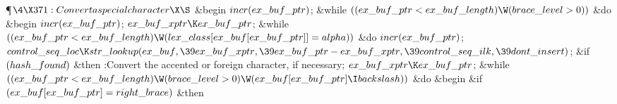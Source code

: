 \Y\P$\4\X371:Convert a special character\X\S$\6
\&{begin} $\\{incr}(\\{ex\_buf\_ptr})$;\6
\&{while} $((\\{ex\_buf\_ptr}<\\{ex\_buf\_length})\W(\\{brace\_level}>0))$ \1%
\&{do}\6
\&{begin} $\\{incr}(\\{ex\_buf\_ptr})$;\6
$\\{ex\_buf\_xptr}\K\\{ex\_buf\_ptr}$;\6
\&{while} $((\\{ex\_buf\_ptr}<\\{ex\_buf\_length})\W(\\{lex\_class}[\\{ex%
\_buf}[\\{ex\_buf\_ptr}]]=\\{alpha}))$ \1\&{do}\5
$\\{incr}(\\{ex\_buf\_ptr})$;\2\6
$\\{control\_seq\_loc}\K\\{str\_lookup}(\\{ex\_buf},\39\\{ex\_buf\_xptr},\39%
\\{ex\_buf\_ptr}-\\{ex\_buf\_xptr},\39\\{control\_seq\_ilk},\39\\{dont%
\_insert})$;\6
\&{if} $(\\{hash\_found})$ \1\&{then}\5
:Convert the accented or foreign character, if necessary\X;\2\6
$\\{ex\_buf\_xptr}\K\\{ex\_buf\_ptr}$;\6
\&{while} $((\\{ex\_buf\_ptr}<\\{ex\_buf\_length})\W(\\{brace\_level}>0)\W(%
\\{ex\_buf}[\\{ex\_buf\_ptr}]\I\\{backslash}))$ \1\&{do}\6
\&{begin} \6
\&{if} $(\\{ex\_buf}[\\{ex\_buf\_ptr}]=\\{right\_brace})$ \1\&{then}\5
